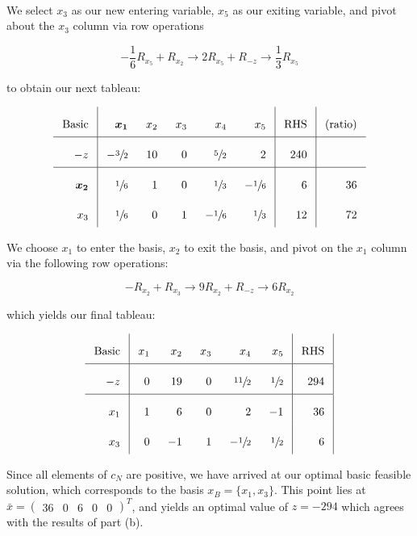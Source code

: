 \begin{solution}
  \ \\
  We select $x_3$ as our new entering variable, $x_5$ as our exiting variable, and pivot about the $x_3$ column via 
  row operations

  $$
  -\frac{1}{6} R_{x_5} + R_{x_2}  \longrightarrow 2 R_{x_5} + R_{-z} \longrightarrow \frac{1}{3} R_{x_5}
  $$

  to obtain our next tableau:

  \[\arraycolsep=8pt\def\arraystretch{2.2}
  \begin{array}{r|rrrrr|r|r}
     \text{Basic} &  \bm{x_1}      &  x_2 &  x_3  &  x_4           &  x_5          &  \text{RHS} &  \text{(ratio)} \\ \hline
    -z            & -\sfrac{3}{2}  &  10  &  0    &  \sfrac{5}{2}  &  2            &  240        &                 \\ \hline
     \bm{x_2}     &  \sfrac{1}{6}  &  1   &  0    &  \sfrac{1}{3}  & -\sfrac{1}{6} &  6          &  36             \\
     x_3          &  \sfrac{1}{6}  &  0   &  1    & -\sfrac{1}{6}  &  \sfrac{1}{3} &  12         &  72                           
  \end{array}
  \]

  We choose $x_1$ to enter the basis, $x_2$ to exit the basis, and pivot on the $x_1$ column via the following row 
  operations:

  $$
  -R_{x_2} + R_{x_3}  \longrightarrow 9 R_{x_2} + R_{-z} \longrightarrow 6 R_{x_2}
  $$


  which yields our final tableau:

  \[\arraycolsep=8pt\def\arraystretch{2.2}
  \begin{array}{r|rrrrr|r|r}
    \text{Basic} &  x_1  &  x_2 &  x_3  &  x_4           &  x_5           &  \text{RHS} \\ \hline
    -z           &  0    &  19  &  0    &  \sfrac{11}{2} &  \sfrac{1}{2}  &  294        \\ \hline
    x_1          &  1    &  6   &  0    &  2             & -1             &  36         \\
    x_3          &  0    & -1   &  1    & -\sfrac{1}{2}  &  \sfrac{1}{2}  &  6                            
  \end{array}
  \]

  Since all elements of $c_N$ are positive, we have arrived at our optimal basic feasible solution, which corresponds to
  the basis $x_B = \{x_1, x_3\}$. This point lies at \linebreak
  $\bar{x} = \begin{pmatrix} 36 &  0  &  6  &  0  &  0 \end{pmatrix}^T$, and yields an optimal value of $z = -294$ which
  agrees with the results of part (b).
  \ \\
\end{solution}